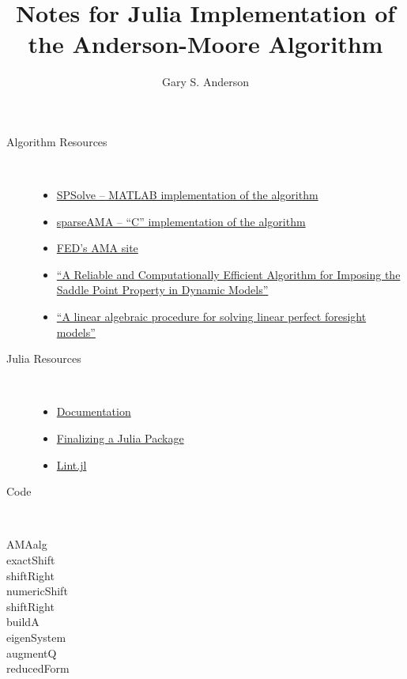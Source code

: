 \documentclass[12pt]{article}
\title{Notes for Julia Implementation of the Anderson-Moore Algorithm}
\author{Gary S. Anderson}
\begin{document}
\maketitle
\begin{description}
\item[Algorithm Resources] \ 
\begin{itemize}
\item \href{https://github.com/es335mathwiz/SPSolve.git}{SPSolve -- MATLAB implementation of the algorithm}
\item \href{https://github.com/es335mathwiz/sparseAMA.git}{sparseAMA -- ``C'' implementation of the algorithm}
\item \href{https://www.federalreserve.gov/econres/ama-index.htm}{FED's AMA site}
\item \href{https://www.sciencedirect.com/science/article/pii/S1474667017405064}{``A Reliable and Computationally Efficient Algorithm for Imposing the Saddle Point Property in Dynamic Models''}
\item \href{https://www.sciencedirect.com/science/article/pii/0165176585902113}{``A linear algebraic procedure for solving linear perfect foresight models''}
\end{itemize}
\item[Julia Resources] \
  \begin{itemize}
  \item \href{https://docs.julialang.org/en/stable/}{Documentation}
  \item \href{http://www.stochasticlifestyle.com/finalizing-julia-package-documentation-testing-coverage-publishing/}{Finalizing a Julia Package}
  \item \href{https://www.google.com/url?sa=t&rct=j&q=&esrc=s&source=web&cd=4&cad=rja&uact=8&ved=0ahUKEwjh_vH_h-DaAhUExYMKHYb7BWoQFgg5MAM&url=https%3A%2F%2Fgithub.com%2Ftonyhffong%2FLint.jl%2Fblob%2Fmaster%2Fdocs%2Ffeatures.md&usg=AOvVaw1FFQ9J64mhTjDx8QpQ-_zU}{Lint.jl}
  \end{itemize}

\item[Code] \
  

\item[AMAalg] 

\item[exactShift]
\item[shiftRight]
\item[numericShift]
\item[shiftRight]
\item[buildA]
\item[eigenSystem]
\item[augmentQ]
\item[reducedForm]



\end{description}
\end{document}
